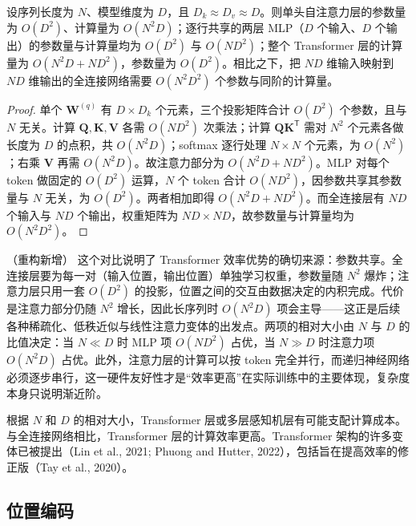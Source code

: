 \documentclass[../../main.tex]{subfiles}
\begin{document}
\begin{proposition}\label{proposition:ch12-计算复杂度}
设序列长度为 $N$、模型维度为 $D$，且 $D_k\approx D_v\approx D$。则单头自注意力层的参数量为 $O(D^2)$、计算量为 $O(N^2D)$；逐行共享的两层 MLP（$D$ 个输入、$D$ 个输出）的参数量与计算量均为 $O(D^2)$ 与 $O(ND^2)$；整个 Transformer 层的计算量为 $O(N^2D+ND^2)$，参数量为 $O(D^2)$。相比之下，把 $ND$ 维输入映射到 $ND$ 维输出的全连接网络需要 $O(N^2D^2)$ 个参数与同阶的计算量。
\end{proposition}

\begin{proof}
单个 $\mathbf{W}^{(q)}$ 有 $D\times D_k$ 个元素，三个投影矩阵合计 $O(D^2)$ 个参数，且与 $N$ 无关。计算 $\mathbf{Q},\mathbf{K},\mathbf{V}$ 各需 $O(ND^2)$ 次乘法；计算 $\mathbf{Q}\mathbf{K}^{\mathsf{T}}$ 需对 $N^2$ 个元素各做长度为 $D$ 的点积，共 $O(N^2D)$；softmax 逐行处理 $N\times N$ 个元素，为 $O(N^2)$；右乘 $\mathbf{V}$ 再需 $O(N^2D)$。故注意力部分为 $O(N^2D+ND^2)$。MLP 对每个 token 做固定的 $O(D^2)$ 运算，$N$ 个 token 合计 $O(ND^2)$，因参数共享其参数量与 $N$ 无关，为 $O(D^2)$。两者相加即得 $O(N^2D+ND^2)$。而全连接层有 $ND$ 个输入与 $ND$ 个输出，权重矩阵为 $ND\times ND$，故参数量与计算量均为 $O(N^2D^2)$。
\end{proof}

\begin{remark}（重构新增）
这个对比说明了 Transformer 效率优势的确切来源：参数共享。全连接层要为每一对（输入位置，输出位置）单独学习权重，参数量随 $N^2$ 爆炸；注意力层只用一套 $O(D^2)$ 的投影，位置之间的交互由数据决定的内积完成。代价是注意力部分仍随 $N^2$ 增长，因此长序列时 $O(N^2D)$ 项会主导——这正是后续各种稀疏化、低秩近似与线性注意力变体的出发点。两项的相对大小由 $N$ 与 $D$ 的比值决定：当 $N\ll D$ 时 MLP 项 $O(ND^2)$ 占优，当 $N\gg D$ 时注意力项 $O(N^2D)$ 占优。此外，注意力层的计算可以按 token 完全并行，而递归神经网络必须逐步串行，这一硬件友好性才是“效率更高”在实际训练中的主要体现，复杂度本身只说明渐近阶。
\end{remark}

根据 $N$ 和 $D$ 的相对大小，Transformer 层或多层感知机层有可能支配计算成本。与全连接网络相比，Transformer 层的计算效率更高。Transformer 架构的许多变体已被提出（Lin et al., 2021; Phuong and Hutter, 2022），包括旨在提高效率的修正版（Tay et al., 2020）。

\subsection{位置编码}\label{subsection:ch12-位置编码}
\end{document}
